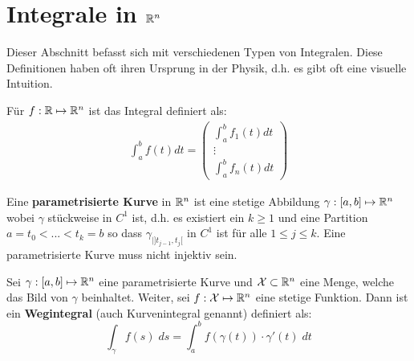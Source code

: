 \section{Integrale in $\mathbb{R}^n$}

Dieser Abschnitt befasst sich mit verschiedenen Typen von Integralen. Diese Definitionen haben oft ihren
Ursprung in der Physik, d.h. es gibt oft eine visuelle Intuition.

Für $f: \mathbb{R} \mapsto \mathbb{R}^n$ ist das Integral definiert als:
\begin{align*}
  \int_a^b f(t) dt =
  \begin{pmatrix}
    \int_a^b f_1(t) dt \\
    \vdots \\
    \int_a^b f_n(t) dt
  \end{pmatrix}
\end{align*}



Eine \textbf{parametrisierte Kurve} in $\mathbb{R}^n$ ist eine stetige Abbildung $\gamma: [a, b] \mapsto \mathbb{R}^n$ wobei $\gamma$
stückweise in $C^1$ ist, d.h. es existiert ein $k \geq 1$ und eine Partition $a = t_0 < ... < t_k = b$ so dass 
$\gamma_{|]t_{j-1}, t_j[}$ in $C^1$ ist für alle $1 \leq j \leq k$. Eine parametrisierte Kurve muss nicht injektiv sein.



Sei $\gamma: [a, b] \mapsto \mathbb{R}^n$ eine parametrisierte Kurve und $\mathcal{X} \subset \mathbb{R}^n$ eine Menge, welche das 
Bild von $\gamma$ beinhaltet. Weiter, sei $f: \mathcal{X} \mapsto \mathbb{R}^n$ eine stetige Funktion. Dann ist ein
\textbf{Wegintegral} (auch Kurvenintegral genannt) definiert als:
$$\int_\gamma f(s) \; ds = \int_a^b f(\gamma(t)) \cdot \gamma'(t) \; dt$$

